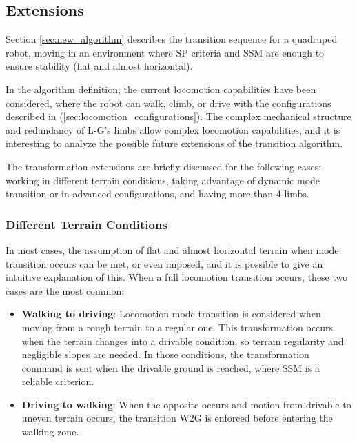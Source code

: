 \subsection{Extensions}
\label{sec:extensions}

Section \ref{sec:new_algorithm} describes the transition sequence for a quadruped robot, moving in an environment where SP criteria and SSM are enough to ensure stability (flat and almost horizontal).

In the algorithm definition, the current locomotion capabilities have been considered, where the robot can walk, climb, or drive with the configurations described in (\ref{sec:locomotion_configurations}). The complex mechanical structure and redundancy of L-G's limbs allow complex locomotion capabilities, and it is interesting to analyze the possible future extensions of the transition algorithm. 

The transformation extensions are briefly discussed for the following cases: working in different terrain conditions, taking advantage of dynamic mode transition or in advanced configurations, and having more than 4 limbs.  

\subsubsection{Different Terrain Conditions}
\label{sec:different_conditions}

In most cases, the assumption of flat and almost horizontal terrain when mode transition occurs can be met, or even imposed, and it is possible to give an intuitive explanation of this. 
When a full locomotion transition occurs, these two cases are the most common: 
\begin{itemize}
    \setlength\itemsep{-0.7em} 
    \item \textbf{Walking to driving}: Locomotion mode transition is considered when moving from a rough terrain to a regular one. This transformation occurs when the terrain changes into a drivable condition, so terrain regularity and negligible slopes are needed. In those conditions, the transformation command is sent when the drivable ground is reached, where SSM is a reliable criterion.   
    \item \textbf{Driving to walking}: When the opposite occurs and motion from drivable to uneven terrain occurs, the transition W2G is enforced before entering the walking zone. 
\end{itemize}


